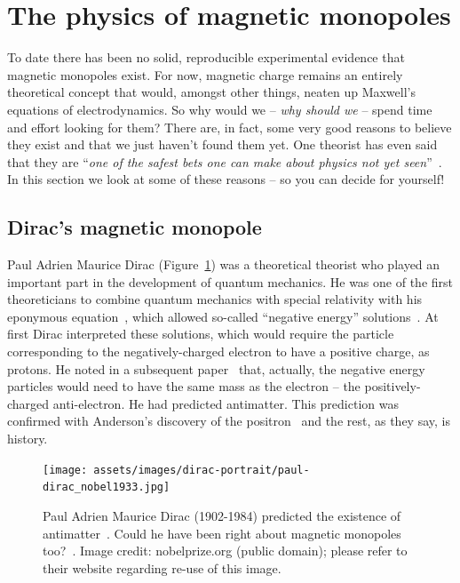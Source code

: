 \section{The physics of magnetic monopoles}
\label{sec:theory}
To date there has been no solid, reproducible experimental evidence that
magnetic monopoles exist. For now, magnetic charge remains an entirely
theoretical concept that would, amongst other things, neaten up Maxwell's
equations of electrodynamics.
%
So why would we -- \emph{why should we} -- spend time and effort looking
for them? There are, in fact, some very good reasons to believe they exist
and that we just haven't found them yet.
%
One theorist has even said that they are ``\emph{one of the safest
bets one can make about physics not yet seen}''~\cite{Polchinski2004}.
%
In this section we look at some of these reasons -- so you
can decide for yourself!

\subsection{Dirac's magnetic monopole}
\label{sec:diracmonopole}
Paul Adrien Maurice Dirac (Figure~\ref{fig:pamdirac}) was a theoretical
theorist who played an important part in the development of quantum mechanics.
He was one of the first theoreticians to combine quantum mechanics with
special relativity with his eponymous equation~\cite{Dirac1928},
which allowed so-called ``negative energy'' solutions~\cite{Dirac1930}.
%
At first Dirac interpreted these solutions,
which would require the particle corresponding to the negatively-charged
electron to have a positive charge, as protons.
%
He noted in a subsequent paper~\cite{Dirac1931} that, actually,
the negative energy particles would need to have the same mass as the
electron -- the positively-charged anti-electron.
%
He had predicted antimatter.
%
This prediction was confirmed with Anderson's discovery of the
positron~\cite{Anderson1933} and the rest, as they say, is history.

%
\begin{figure}[htbp]
  \centering
  \texttt{[image: assets/images/dirac-portrait/paul-dirac\_nobel1933.jpg]}
  \caption[Paul A. M. Dirac]
  {\label{fig:pamdirac}%
Paul Adrien Maurice Dirac (1902-1984) predicted the existence of antimatter~\cite{Dirac1930}.
Could he have been right about magnetic monopoles too?~\cite{Dirac1931}.
Image credit: nobelprize.org (public domain); please refer to their website
regarding re-use of this image.} 
\end{figure}
%

